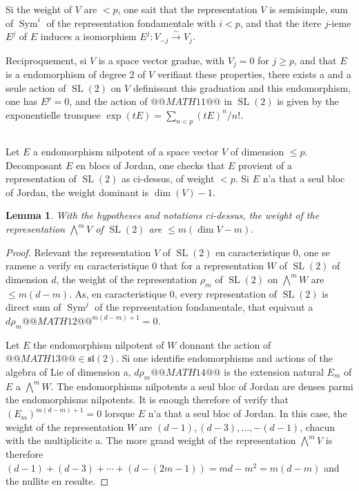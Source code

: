 \documentclass[11pt,a4paper]{article}
\theoremstyle{plain}
\newtheorem{lemma}[theorem]{Lemma}
\theoremstyle{definition}
\DeclareMathOperator{\Sym}{Sym}
\DeclareMathOperator{\SL}{SL}
\begin{document}
Si the weight of $V$ are $< p$, one sait that the representation $V$ is semisimple, sum of $\Sym^i$ of the representation fondamentale with $i < p$, and that the itere $j$-ieme $E^j$ of $E$ induces a isomorphism $E^j: V_{-j} \xrightarrow{\sim} V_j$.

Reciproquement, si $V$ is a space vector gradue, with $V_j = 0$ for $j \geq p$, and that $E$ is a endomorphism of degree 2 of $V$ verifiant these properties, there exists a and a seule action of $\SL(2)$ on $V$ definissant this graduation and this endomorphism, one has $E^p = 0$, and the action of $@@MATH11@@$ in $\SL(2)$ is given by the exponentielle tronquee $\exp(tE) = \sum_{n < p} (tE)^n/n!$.

\subsection{}
Let $E$ a endomorphism nilpotent of a space vector $V$ of dimension $\leq p$. Decomposant $E$ en blocs of Jordan, one checks that $E$ provient of a representation of $\SL(2)$ as ci-dessus, of weight $< p$. Si $E$ n'a that a seul bloc of Jordan, the weight dominant is $\dim(V) - 1$.

\begin{lemma}\label{lem:5.5}
With the hypotheses and notations ci-dessus, the weight of the representation $\bigwedge^m V$ of $\SL(2)$ are $\leq m(\dim V - m)$.
\end{lemma}

\begin{proof}
Relevant the representation $V$ of $\SL(2)$ en caracteristique 0, one se ramene a verify en caracteristique 0 that for a representation $W$ of $\SL(2)$ of dimension $d$, the weight of the representation $\rho_m$ of $\SL(2)$ on $\bigwedge^m W$ are $\leq m(d - m)$. As, en caracteristique 0, every representation of $\SL(2)$ is direct sum of $\Sym^j$ of the representation fondamentale, that equivaut a $d\rho_m @@MATH12@@^{m(d-m)+1} = 0$.

Let $E$ the endomorphism nilpotent of $W$ donnant the action of $@@MATH13@@ \in \mathfrak{sl}(2)$. Si one identifie endomorphisms and actions of the algebra of Lie of dimension a, $d\rho_m @@MATH14@@$ is the extension natural $E_m$ of $E$ a $\bigwedge^m W$. The endomorphisms nilpotents a seul bloc of Jordan are denses parmi the endomorphisms nilpotents. It is enough therefore of verify that $(E_m)^{m(d-m)+1} = 0$ lorsque $E$ n'a that a seul bloc of Jordan. In this case, the weight of the representation $W$ are $(d-1), (d-3), \ldots, -(d-1)$, chacun with the multiplicite a. The more grand weight of the representation $\bigwedge^m V$ is therefore $(d-1) + (d-3) + \cdots + (d - (2m-1)) = md - m^2 = m(d - m)$ and the nullite en resulte.
\end{proof}
\end{document}
